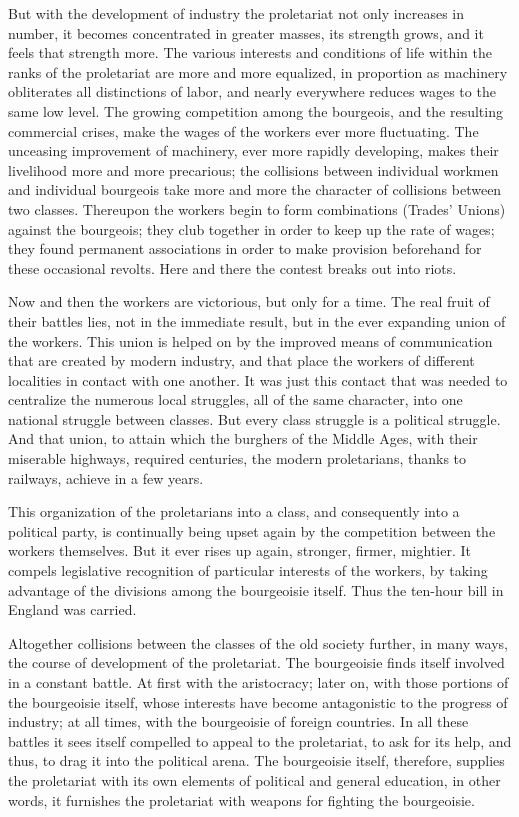 But with the development of industry the proletariat not only increases in number, it becomes concentrated in greater masses, its strength grows, and it feels that strength more. The various interests and conditions of life within the ranks of the proletariat are more and more equalized, in proportion as machinery obliterates all distinctions of labor, and nearly everywhere reduces wages to the same low level. The growing competition among the bourgeois, and the resulting commercial crises, make the wages of the workers ever more fluctuating. The unceasing improvement of machinery, ever more rapidly developing, makes their livelihood more and more precarious; the collisions between individual workmen and individual bourgeois take more and more the character of collisions between two classes. Thereupon the workers begin to form combinations (Trades' Unions) against the bourgeois; they club together in order to keep up the rate of wages; they found permanent associations in order to make provision beforehand for these occasional revolts. Here and there the contest breaks out into riots.

Now and then the workers are victorious, but only for a time. The real fruit of their battles lies, not in the immediate result, but in the ever expanding union of the workers. This union is helped on by the improved means of communication that are created by modern industry, and that place the workers of different localities in contact with one another. It was just this contact that was needed to centralize the numerous local struggles, all of the same character, into one national struggle between classes. But every class struggle is a political struggle. And that union, to attain which the burghers of the Middle Ages, with their miserable highways, required centuries, the modern proletarians, thanks to railways, achieve in a few years.

This organization of the proletarians into a class, and consequently into a political party, is continually being upset again by the competition between the workers themselves. But it ever rises up again, stronger, firmer, mightier. It compels legislative recognition of particular interests of the workers, by taking advantage of the divisions among the bourgeoisie itself. Thus the ten-hour bill in England was carried.

Altogether collisions between the classes of the old society further, in many ways, the course of development of the proletariat. The bourgeoisie finds itself involved in a constant battle. At first with the aristocracy; later on, with those portions of the bourgeoisie itself, whose interests have become antagonistic to the progress of industry; at all times, with the bourgeoisie of foreign countries. In all these battles it sees itself compelled to appeal to the proletariat, to ask for its help, and thus, to drag it into the political arena. The bourgeoisie itself, therefore, supplies the proletariat with its own elements of political and general education, in other words, it furnishes the proletariat with weapons for fighting the bourgeoisie.

